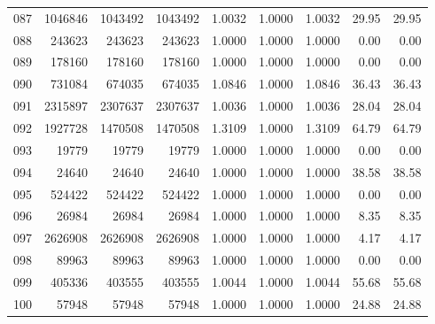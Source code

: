 \begin{longtable}{crrrrrrrr}
087 & 1046846 & 1043492 & 1043492 & 1.0032 & 1.0000 & 1.0032 & 29.95 & 29.95 \\
088 & 243623 & 243623 & 243623 & 1.0000 & 1.0000 & 1.0000 & 0.00 & 0.00 \\
089 & 178160 & 178160 & 178160 & 1.0000 & 1.0000 & 1.0000 & 0.00 & 0.00 \\
090 & 731084 & 674035 & 674035 & 1.0846 & 1.0000 & 1.0846 & 36.43 & 36.43 \\
091 & 2315897 & 2307637 & 2307637 & 1.0036 & 1.0000 & 1.0036 & 28.04 & 28.04 \\
092 & 1927728 & 1470508 & 1470508 & 1.3109 & 1.0000 & 1.3109 & 64.79 & 64.79 \\
093 & 19779 & 19779 & 19779 & 1.0000 & 1.0000 & 1.0000 & 0.00 & 0.00 \\
094 & 24640 & 24640 & 24640 & 1.0000 & 1.0000 & 1.0000 & 38.58 & 38.58 \\
095 & 524422 & 524422 & 524422 & 1.0000 & 1.0000 & 1.0000 & 0.00 & 0.00 \\
096 & 26984 & 26984 & 26984 & 1.0000 & 1.0000 & 1.0000 & 8.35 & 8.35 \\
097 & 2626908 & 2626908 & 2626908 & 1.0000 & 1.0000 & 1.0000 & 4.17 & 4.17 \\
098 & 89963 & 89963 & 89963 & 1.0000 & 1.0000 & 1.0000 & 0.00 & 0.00 \\
099 & 405336 & 403555 & 403555 & 1.0044 & 1.0000 & 1.0044 & 55.68 & 55.68 \\
100 & 57948 & 57948 & 57948 & 1.0000 & 1.0000 & 1.0000 & 24.88 & 24.88 \\
\end{longtable}

